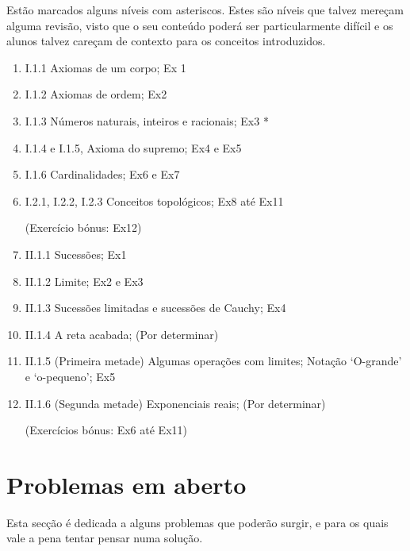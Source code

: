 \documentclass{article}
\begin{document}
	Estão marcados alguns níveis com asteriscos. Estes são níveis que talvez mereçam alguma revisão, visto que o seu conteúdo poderá ser particularmente difícil e os alunos talvez careçam de contexto para os conceitos introduzidos.
	
	\begin{enumerate}
	\item I.1.1 Axiomas de um corpo; Ex 1
	
	\item I.1.2 Axiomas de ordem; Ex2
	
	\item I.1.3 Números naturais, inteiros e racionais; Ex3 *
	
	\item I.1.4 e I.1.5, Axioma do supremo; Ex4 e Ex5
	
	\item I.1.6 Cardinalidades; Ex6 e Ex7
	
	\item I.2.1, I.2.2, I.2.3 Conceitos topológicos; Ex8 até Ex11
	
	(Exercício bónus: Ex12)
	
	\item II.1.1 Sucessões; Ex1
	
	\item II.1.2 Limite; Ex2 e Ex3
	
	\item II.1.3 Sucessões limitadas e sucessões de Cauchy; Ex4
	
	\item II.1.4 A reta acabada; (Por determinar)
	
	\item II.1.5 (Primeira metade) Algumas operações com limites; Notação `O-grande' e `o-pequeno'; Ex5
	
	\item II.1.6 (Segunda metade) Exponenciais reais; (Por determinar)
	
	(Exercícios bónus: Ex6 até Ex11)
	\end{enumerate}
	
	\section{Problemas em aberto}
	
	Esta secção é dedicada a alguns problemas que poderão surgir, e para os quais vale a pena tentar pensar numa solução.
	
\end{document}
